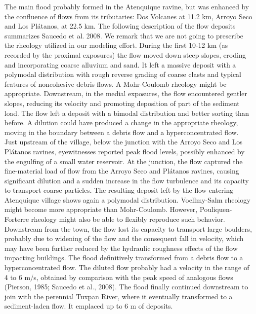 \documentclass[nhess, manuscript]{copernicus}
\begin{document}
The main flood probably formed in the Atenquique ravine, but was enhanced by the confluence of flows from its tributaries: Dos Volcanes at 11.2 km, Arroyo Seco and Los Plátanos, at 22.5 km. The following description of the flow deposits summarizes Saucedo et al. 2008. We remark that we are not going to prescribe the rheology utilized in our modeling effort. During the first 10-12 km (as recorded by the proximal exposures) the flow moved down steep slopes, eroding and incorporating coarse alluvium and sand. It left a massive deposit with a polymodal distribution with rough reverse grading of coarse clasts and typical features of noncohesive debris flows. A Mohr-Coulomb rheology might be appropriate. Downstream, in the medial exposures, the flow encountered gentler slopes, reducing its velocity and promoting deposition of part of the sediment load. The flow left a deposit with a bimodal distribution and better sorting than before. A dilution could have produced a change in the appropriate rheology, moving in the boundary between a debris flow and a hyperconcentrated flow. Just upstream of the village, below the junction with the Arroyo Seco and Los Plátanos ravines, eyewitnesses reported peak flood levels, possibly enhanced by the engulfing of a small water reservoir. At the junction, the flow captured the fine-material load of flow from the Arroyo Seco and Plátanos ravines, causing significant dilution and a sudden increase in the flow turbulence and its capacity to transport coarse particles. The resulting deposit left by the flow entering Atenquique village shows again a polymodal distribution. Voellmy-Salm rheology might become more appropriate than Mohr-Coulomb. However, Pouliquen-Forterre rheology might also be able to flexibly reproduce such behavior. Downstream from the town, the flow lost its capacity to transport large boulders, probably due to widening of the flow and the consequent fall in velocity, which may have been further reduced by the hydraulic roughness effects of the flow impacting buildings. The flood definitively transformed from a debris flow to a hyperconcentrated flow. The diluted flow probably had a velocity in the range of 4 to 6 m/s, obtained by comparison with the peak speed of analogous flows (Pierson, 1985; Saucedo et al., 2008). The flood finally continued downstream to join with the perennial Tuxpan River, where it eventually transformed to a sediment-laden flow. It emplaced up to 6 m of deposits.
\end{document}
